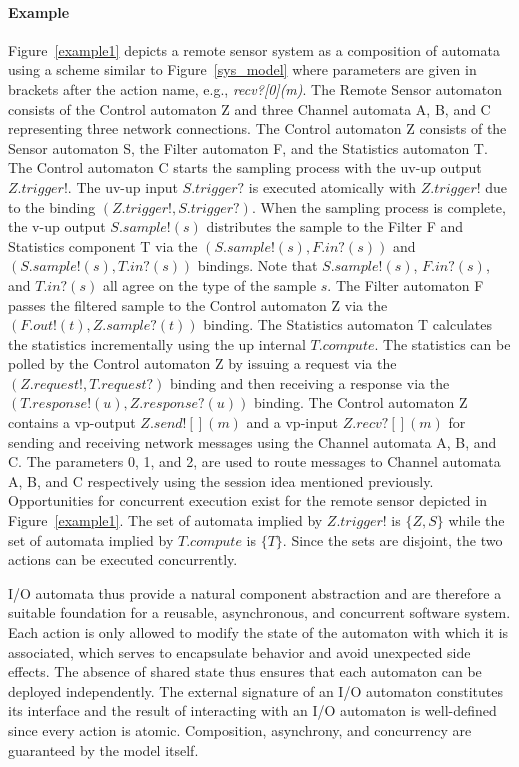 \paragraph*{Example}
Figure~\ref{example1} depicts a remote sensor system as a composition of automata using a scheme similar to Figure~\ref{sys_model} where parameters are given in brackets after the action name, e.g., \emph{recv?[0](m)}.
The Remote Sensor automaton consists of the Control automaton Z and three Channel automata A, B, and C representing three network connections.
The Control automaton Z consists of the Sensor automaton S, the Filter automaton F, and the Statistics automaton T.
The Control automaton C starts the sampling process with the uv-up output $Z.trigger!$.
The uv-up input $S.trigger?$ is executed atomically with $Z.trigger!$ due to the binding $(Z.trigger!, S.trigger?)$.
When the sampling process is complete, the v-up output $S.sample!(s)$ distributes the sample to the Filter F and Statistics component T via the $(S.sample!(s), F.in?(s))$ and $(S.sample!(s), T.in?(s))$ bindings.
Note that $S.sample!(s)$, $F.in?(s)$, and $T.in?(s)$ all agree on the type of the sample $s$.
The Filter automaton F passes the filtered sample to the Control automaton Z via the $(F.out!(t), Z.sample?(t))$ binding.
The Statistics automaton T calculates the statistics incrementally using the up internal $T.compute$.
The statistics can be polled by the Control automaton Z by issuing a request via the $(Z.request!, T.request?)$ binding and then receiving a response via the $(T.response!(u), Z.response?(u))$ binding.
The Control automaton Z contains a vp-output $Z.send![](m)$ and a vp-input $Z.recv?[](m)$ for sending and receiving network messages using the Channel automata A, B, and C.
The parameters 0, 1, and 2, are used to route messages to Channel automata A, B, and C respectively using the session idea mentioned previously.
Opportunities for concurrent execution exist for the remote sensor depicted in Figure~\ref{example1}.
The set of automata implied by $Z.trigger!$ is $\{Z, S\}$ while the set of automata implied by $T.compute$ is $\{T\}$.
Since the sets are disjoint, the two actions can be executed concurrently.
\fi

I/O automata thus provide a natural component abstraction and are therefore a suitable foundation for a reusable, asynchronous, and concurrent software system.
Each action is only allowed to modify the state of the automaton with which it is associated, which serves to encapsulate behavior and avoid unexpected side effects.
The absence of shared state thus ensures that each automaton can be deployed independently.
The external signature of an I/O automaton constitutes its interface and the result of interacting with an I/O automaton is well-defined since every action is atomic.
Composition, asynchrony, and concurrency are guaranteed by the model itself.

